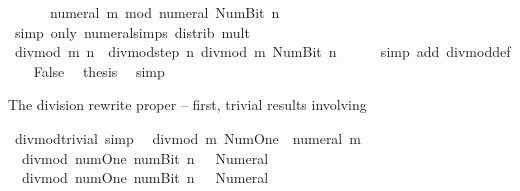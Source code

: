\begin{isabellebody}
\ \ \ \ \ \ numeral\ m\ mod\ numeral\ {\isacharparenleft}{\kern0pt}Num{\isachardot}{\kern0pt}Bit{}\ n{\isacharparenright}{\kern0pt}{\isacharparenright}{\kern0pt}{\isachardoublequoteclose}\isanewline
\ \ \ \ \isamarkupfalse%
\ {\isacharparenleft}{\kern0pt}simp\ only{\isacharcolon}{\kern0pt}\ numeral{\isachardot}{\kern0pt}simps\ distrib\ mult{\isacharunderscore}{\kern0pt}{}{\isacharparenright}{\kern0pt}\isanewline
\ \ \isamarkupfalse%
\ \isamarkupfalse%
\ {\isachardoublequoteopen}divmod\ m\ n\ {\isacharequal}{\kern0pt}\ divmod{\isacharunderscore}{\kern0pt}step\ n\ {\isacharparenleft}{\kern0pt}divmod\ m\ {\isacharparenleft}{\kern0pt}Num{\isachardot}{\kern0pt}Bit{}\ n{\isacharparenright}{\kern0pt}{\isacharparenright}{\kern0pt}{\isachardoublequoteclose}\isanewline
\ \ \ \ \isamarkupfalse%
\ {\isacharparenleft}{\kern0pt}simp\ add{\isacharcolon}{\kern0pt}\ divmod{\isacharunderscore}{\kern0pt}def{\isacharparenright}{\kern0pt}\isanewline
\ \ \isamarkupfalse%
\ False\ \isamarkupfalse%
\ {\isacharquery}{\kern0pt}thesis\ \isamarkupfalse%
\ simp\isanewline
{}\isamarkupfalse%
%
\endisatagproof
{\isafoldproof}%
%
\isadelimproof
%
\endisadelimproof
%
\begin{isamarkuptext}%
The division rewrite proper -- first, trivial results involving %
\end{isamarkuptext}\isamarkuptrue%
\isamarkupfalse%
\ divmod{\isacharunderscore}{\kern0pt}trivial\ {\isacharbrackleft}{\kern0pt}simp{\isacharbrackright}{\kern0pt}{\isacharcolon}{\kern0pt}\isanewline
\ \ {\isachardoublequoteopen}divmod\ m\ Num{\isachardot}{\kern0pt}One\ {\isacharequal}{\kern0pt}\ {\isacharparenleft}{\kern0pt}numeral\ m{\isacharcomma}{\kern0pt}\ {}{\isacharparenright}{\kern0pt}{\isachardoublequoteclose}\isanewline
\ \ {\isachardoublequoteopen}divmod\ num{\isachardot}{\kern0pt}One\ {\isacharparenleft}{\kern0pt}num{\isachardot}{\kern0pt}Bit{}\ n{\isacharparenright}{\kern0pt}\ {\isacharequal}{\kern0pt}\ {\isacharparenleft}{\kern0pt}{}{\isacharcomma}{\kern0pt}\ Numeral{}{\isacharparenright}{\kern0pt}{\isachardoublequoteclose}\isanewline
\ \ {\isachardoublequoteopen}divmod\ num{\isachardot}{\kern0pt}One\ {\isacharparenleft}{\kern0pt}num{\isachardot}{\kern0pt}Bit{}\ n{\isacharparenright}{\kern0pt}\ {\isacharequal}{\kern0pt}\ {\isacharparenleft}{\kern0pt}{}{\isacharcomma}{\kern0pt}\ Numeral{}{\isacharparenright}{\kern0pt}{\isachardoublequoteclose}\isanewline

\end{isabellebody}
